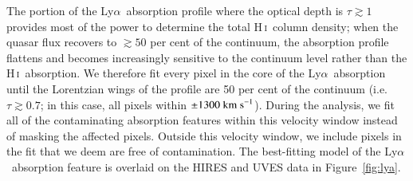 \documentclass[12pt,preprint,useAMS,usenatbib]{emulateapj}
\newcommand{\HI}{\textrm{H}\,\textsc{i}}
\newcommand{\Lya}{Ly$\alpha$}
\begin{document}
The portion of the \Lya\ absorption profile where the optical depth is
$\tau\gtrsim1$ provides most of the power to determine the total
\HI\ column density; when the quasar flux recovers to $\gtrsim50$
per cent of the continuum, the absorption profile flattens and becomes
increasingly sensitive to the continuum level rather than the \HI\ absorption. We therefore
fit every pixel in the core of the \Lya\ absorption until the Lorentzian wings of
the profile are 50 per cent of the continuum (i.e. $\tau\gtrsim0.7$; in this case, all pixels within
$\pm1300~{\rm km~s}^{-1}$). During the analysis, we fit all of the
contaminating absorption features within this velocity window instead
of masking the affected pixels. Outside this velocity window, we include pixels in the
fit that we deem are free of contamination. The best-fitting model of the
\Lya\ absorption feature is overlaid on the HIRES and UVES data in
Figure~\ref{fig:lya}.
\end{document}
